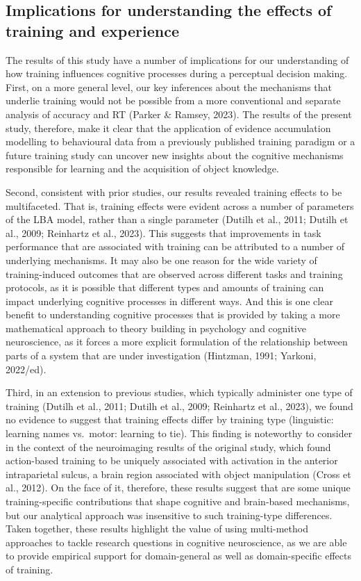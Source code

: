 \documentclass[
  man, donotrepeattitle,floatsintext]{apa6}
\begin{document}
\subsection{Implications for understanding the effects of training and experience}\label{implications-for-understanding-the-effects-of-training-and-experience}

The results of this study have a number of implications for our understanding of how training influences cognitive processes during a perceptual decision making. First, on a more general level, our key inferences about the mechanisms that underlie training would not be possible from a more conventional and separate analysis of accuracy and RT (Parker \& Ramsey, 2023). The results of the present study, therefore, make it clear that the application of evidence accumulation modelling to behavioural data from a previously published training paradigm or a future training study can uncover new insights about the cognitive mechanisms responsible for learning and the acquisition of object knowledge.

Second, consistent with prior studies, our results revealed training effects to be multifaceted. That is, training effects were evident across a number of parameters of the LBA model, rather than a single parameter (Dutilh et al., 2011; Dutilh et al., 2009; Reinhartz et al., 2023). This suggests that improvements in task performance that are associated with training can be attributed to a number of underlying mechanisms. It may also be one reason for the wide variety of training-induced outcomes that are observed across different tasks and training protocols, as it is possible that different types and amounts of training can impact underlying cognitive processes in different ways. And this is one clear benefit to understanding cognitive processes that is provided by taking a more mathematical approach to theory building in psychology and cognitive neuroscience, as it forces a more explicit formulation of the relationship between parts of a system that are under investigation (Hintzman, 1991; Yarkoni, 2022/ed).

Third, in an extension to previous studies, which typically administer one type of training (Dutilh et al., 2011; Dutilh et al., 2009; Reinhartz et al., 2023), we found no evidence to suggest that training effects differ by training type (linguistic: learning names vs.~motor: learning to tie). This finding is noteworthy to consider in the context of the neuroimaging results of the original study, which found action-based training to be uniquely associated with activation in the anterior intraparietal sulcus, a brain region associated with object manipulation (Cross et al., 2012). On the face of it, therefore, these results suggest that are some unique training-specific contributions that shape cognitive and brain-based mechanisms, but our analytical approach was insensitive to such training-type differences. Taken together, these results highlight the value of using multi-method approaches to tackle research questions in cognitive neuroscience, as we are able to provide empirical support for domain-general as well as domain-specific effects of training.
\end{document}
